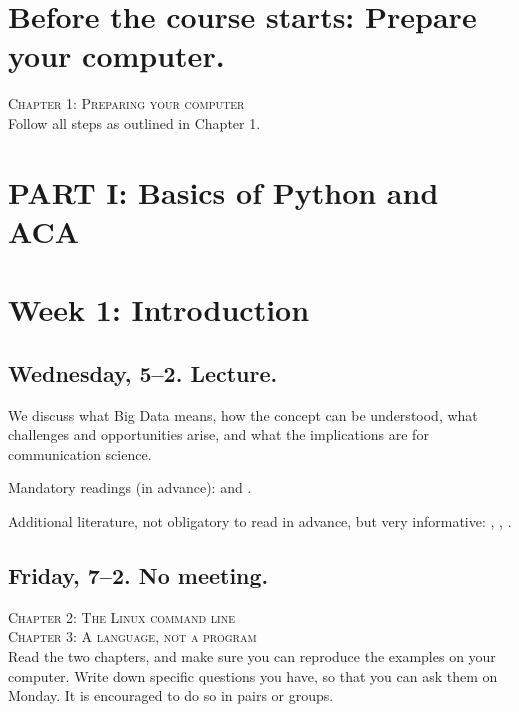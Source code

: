 \section*{Before the course starts: Prepare your computer.}
\textsc{ Chapter 1: Preparing your computer}\\
Follow all steps as outlined in Chapter 1.


\section*{PART I: Basics of Python and ACA}

\section*{Week 1: Introduction}
\subsection*{Wednesday, 5--2. Lecture.}
We discuss what Big Data means, how the concept can be understood, what challenges and opportunities arise, and what the implications are for communication science. 

Mandatory readings (in advance): \cite{boyd2012} and \cite{Kitchin2014}. 

Additional literature, not obligatory to read in advance, but very informative: \cite{Mahrt2013}, \cite{Vis2013}, \cite{Trilling2017a}.



\subsection*{Friday, 7--2. No meeting.}
\textsc{ Chapter 2: The Linux command line}\\
\textsc{ Chapter 3: A language, not a program}\\

Read the two chapters, and make sure you can reproduce the examples on your computer. Write down specific questions you have, so that you can ask them on Monday. It is encouraged to do so in pairs or groups.




